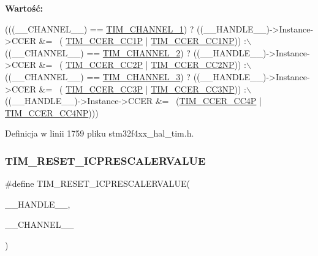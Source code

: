 {\bfseries Wartość\+:}
\begin{DoxyCode}
(((\_\_CHANNEL\_\_) == \hyperlink{group___t_i_m___channel_ga6b1541e4a49d62610899e24bf23f4879}{TIM\_CHANNEL\_1}) ? ((\_\_HANDLE\_\_)->Instance->CCER &= ~(
      \hyperlink{group___peripheral___registers___bits___definition_ga0ca0aedba14241caff739afb3c3ee291}{TIM\_CCER\_CC1P} | \hyperlink{group___peripheral___registers___bits___definition_ga403fc501d4d8de6cabee6b07acb81a36}{TIM\_CCER\_CC1NP})) :\(\backslash\)
   ((\_\_CHANNEL\_\_) == \hyperlink{group___t_i_m___channel_ga33e02d43345a7ac5886f01b39e4f7ccd}{TIM\_CHANNEL\_2}) ? ((\_\_HANDLE\_\_)->Instance->CCER &= ~(
      \hyperlink{group___peripheral___registers___bits___definition_ga3136c6e776c6066509d298b6a9b34912}{TIM\_CCER\_CC2P} | \hyperlink{group___peripheral___registers___bits___definition_ga387de559d8b16b16f3934fddd2aa969f}{TIM\_CCER\_CC2NP})) :\(\backslash\)
   ((\_\_CHANNEL\_\_) == \hyperlink{group___t_i_m___channel_ga4ea100c1789b178f3cb46721b7257e2d}{TIM\_CHANNEL\_3}) ? ((\_\_HANDLE\_\_)->Instance->CCER &= ~(
      \hyperlink{group___peripheral___registers___bits___definition_ga6220a5cd34c7a7a39e10c854aa00d2e5}{TIM\_CCER\_CC3P} | \hyperlink{group___peripheral___registers___bits___definition_ga4029686d3307111d3f9f4400e29e4521}{TIM\_CCER\_CC3NP})) :\(\backslash\)
   ((\_\_HANDLE\_\_)->Instance->CCER &= ~(\hyperlink{group___peripheral___registers___bits___definition_ga3faf23dc47e1b0877352d7f5a00f72e1}{TIM\_CCER\_CC4P} | 
      \hyperlink{group___peripheral___registers___bits___definition_ga41b88bff3f38cec0617ce66fa5aef260}{TIM\_CCER\_CC4NP})))
\end{DoxyCode}


Definicja w linii 1759 pliku stm32f4xx\+\_\+hal\+\_\+tim.\+h.

\mbox{\label{group___t_i_m___private___macros_ga18ded32faf42c8981c8d2970bb02e126}} 
\subsubsection{\texorpdfstring{T\+I\+M\+\_\+\+R\+E\+S\+E\+T\+\_\+\+I\+C\+P\+R\+E\+S\+C\+A\+L\+E\+R\+V\+A\+L\+UE}{TIM\_RESET\_ICPRESCALERVALUE}}
{\footnotesize\ttfamily \#define T\+I\+M\+\_\+\+R\+E\+S\+E\+T\+\_\+\+I\+C\+P\+R\+E\+S\+C\+A\+L\+E\+R\+V\+A\+L\+UE(\begin{DoxyParamCaption}\item[{}]{\+\_\+\+\_\+\+H\+A\+N\+D\+L\+E\+\_\+\+\_\+,  }\item[{}]{\+\_\+\+\_\+\+C\+H\+A\+N\+N\+E\+L\+\_\+\+\_\+ }\end{DoxyParamCaption})}

